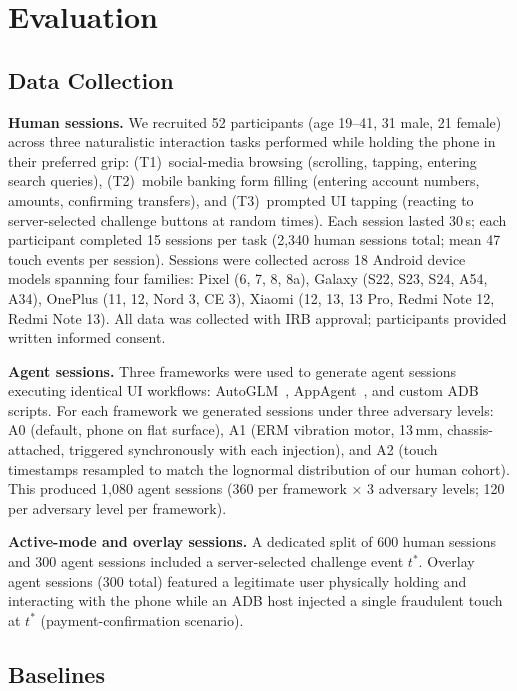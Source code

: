 \section{Evaluation}
\label{sec:eval}

\subsection{Data Collection}
\label{sec:data}

\noindent\textbf{Human sessions.}
We recruited 52 participants (age 19--41, 31 male, 21 female) across three naturalistic
interaction tasks performed while holding the phone in their preferred grip:
(T1)~social-media browsing (scrolling, tapping, entering search queries),
(T2)~mobile banking form filling (entering account numbers, amounts, confirming transfers),
and (T3)~prompted UI tapping (reacting to server-selected challenge buttons at random times).%
Each session lasted 30\,s; each participant completed 15 sessions per task
(2{,}340 human sessions total; mean 47 touch events per session).%
Sessions were collected across 18 Android device models spanning four families:
Pixel (6, 7, 8, 8a), Galaxy (S22, S23, S24, A54, A34), OnePlus (11, 12, Nord 3, CE 3),
Xiaomi (12, 13, 13 Pro, Redmi Note 12, Redmi Note 13).%
All data was collected with IRB approval; participants provided written informed consent.%

\noindent\textbf{Agent sessions.}
Three frameworks were used to generate agent sessions executing identical UI workflows:
AutoGLM~\cite{autoglm2024}, AppAgent~\cite{appagent2024}, and custom ADB scripts.%
For each framework we generated sessions under three adversary levels:
A0 (default, phone on flat surface), A1 (ERM vibration motor, 13\,mm, chassis-attached,
triggered synchronously with each injection), and A2 (touch timestamps resampled to
match the lognormal distribution of our human cohort).%
This produced 1{,}080 agent sessions (360 per framework × 3 adversary levels; 120 per
adversary level per framework).%

\noindent\textbf{Active-mode and overlay sessions.}
A dedicated split of 600 human sessions and 300 agent sessions included a server-selected
challenge event $t^*$.%
Overlay agent sessions (300 total) featured a legitimate user physically holding and
interacting with the phone while an ADB host injected a single fraudulent touch at $t^*$
(payment-confirmation scenario).%

\subsection{Baselines}
\label{sec:baselines}


